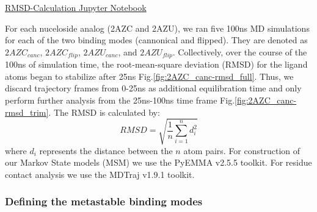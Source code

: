 \documentclass[fleqn,10pt]{wlscirep}
\begin{document}
\href{https://github.com/nathanmlim/Spitale/blob/master/manual_md/notebooks/RMSD-calculations.ipynb}{RMSD-Calculation Jupyter Notebook}

For each nuceloside analog (2AZC and 2AZU), we ran five 100ns MD simulations for each of the two binding modes (cannonical and flipped).
They are denoted as $2AZC_{canc}$, $2AZC_{flip}$, $2AZU_{canc}$, and $2AZU_{flip}$.
Collectively, over the course of the 100ns of simulation time, the root-mean-square deviation (RMSD) for the ligand atoms began to stabilize after 25ns Fig.\ref{fig:2AZC_canc-rmsd_full}.
Thus, we discard trajectory frames from 0-25ns as additional equilibration time and only perform further analysis from the 25ns-100ns time frame Fig.\ref{fig:2AZC_canc-rmsd_trim}.
The RMSD is calculated by:
\begin{equation}
    RMSD = \sqrt{ \frac{1}{n} \sum^{n}_{i=1}{d_{i}^{2}}}
\end{equation}
where $d_{i}$ represents the distance between the $n$ atom pairs.
For construction of our Markov State models (MSM) we use the PyEMMA v2.5.5 \cite{} toolkit.
For residue contact analysis we use the MDTraj v1.9.1 \cite{} toolkit.

\subsubsection{Defining the metastable binding modes}
\end{document}
